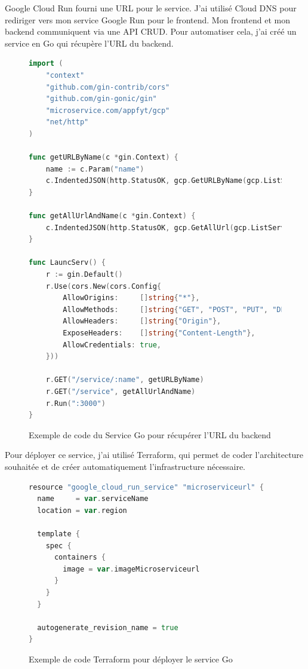 Google Cloud Run fourni une URL pour le service. J'ai utilisé Cloud DNS pour rediriger vers mon service Google Run pour le frontend. Mon frontend et mon backend communiquent via une API CRUD. Pour automatiser cela, j'ai créé un service en Go qui récupère l'URL du backend.
\begin{figure}[H]
    \centering
    \begin{minipage}{.8\textwidth}
        \centering
        \begin{lstlisting}[language=Go, basicstyle=\ttfamily\scriptsize]
import (
    "context"
    "github.com/gin-contrib/cors"
    "github.com/gin-gonic/gin"
    "microservice.com/appfyt/gcp"
    "net/http"
)

func getURLByName(c *gin.Context) {
    name := c.Param("name")
    c.IndentedJSON(http.StatusOK, gcp.GetURLByName(gcp.ListServicesRequest(gcp.ConnectToGCP(context.Background()), context.Background()), name))
}

func getAllUrlAndName(c *gin.Context) {
    c.IndentedJSON(http.StatusOK, gcp.GetAllUrl(gcp.ListServicesRequest(gcp.ConnectToGCP(context.Background()), context.Background())))
}

func LauncServ() {
    r := gin.Default()
    r.Use(cors.New(cors.Config{
        AllowOrigins:     []string{"*"},
        AllowMethods:     []string{"GET", "POST", "PUT", "DELETE", "OPTIONS"},
        AllowHeaders:     []string{"Origin"},
        ExposeHeaders:    []string{"Content-Length"},
        AllowCredentials: true,
    }))

    r.GET("/service/:name", getURLByName)
    r.GET("/service", getAllUrlAndName)
    r.Run(":3000")
}
        \end{lstlisting}
        \caption{Exemple de code du Service Go pour récupérer l'URL du backend}
    \end{minipage}
\end{figure}

Pour déployer ce service, j'ai utilisé Terraform, qui permet de coder l'architecture souhaitée et de créer automatiquement l'infrastructure nécessaire.
\begin{figure}[H]
    \centering
    \begin{minipage}{.8\textwidth}
        \centering
        \begin{lstlisting}[language=Go, basicstyle=\ttfamily\scriptsize]
resource "google_cloud_run_service" "microserviceurl" {
  name     = var.serviceName
  location = var.region

  template {
    spec {
      containers {
        image = var.imageMicroserviceurl
      }
    }
  }

  autogenerate_revision_name = true
}
        \end{lstlisting}
        \caption{Exemple de code Terraform pour déployer le service Go}
    \end{minipage}
\end{figure}

